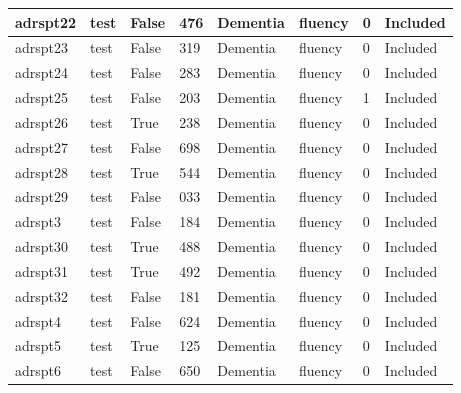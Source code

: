 \begin{center}
\begin{longtable}{|l|l|l|l|l|l|l|l|}
adrspt22       & test                  & False             & 476     & Dementia       & fluency         & 0            & Included      \\ \hline
adrspt23       & test                  & False             & 319     & Dementia       & fluency         & 0            & Included      \\ \hline
adrspt24       & test                  & False             & 283     & Dementia       & fluency         & 0            & Included      \\ \hline
adrspt25       & test                  & False             & 203     & Dementia       & fluency         & 1            & Included      \\ \hline
adrspt26       & test                  & True              & 238     & Dementia       & fluency         & 0            & Included      \\ \hline
adrspt27       & test                  & False             & 698     & Dementia       & fluency         & 0            & Included      \\ \hline
adrspt28       & test                  & True              & 544     & Dementia       & fluency         & 0            & Included      \\ \hline
adrspt29       & test                  & False             & 033     & Dementia       & fluency         & 0            & Included      \\ \hline
adrspt3        & test                  & False             & 184     & Dementia       & fluency         & 0            & Included      \\ \hline
adrspt30       & test                  & True              & 488     & Dementia       & fluency         & 0            & Included      \\ \hline
adrspt31       & test                  & True              & 492     & Dementia       & fluency         & 0            & Included      \\ \hline
adrspt32       & test                  & False             & 181     & Dementia       & fluency         & 0            & Included      \\ \hline
adrspt4        & test                  & False             & 624     & Dementia       & fluency         & 0            & Included      \\ \hline
adrspt5        & test                  & True              & 125     & Dementia       & fluency         & 0            & Included      \\ \hline
adrspt6        & test                  & False             & 650     & Dementia       & fluency         & 0            & Included      \\ \hline

\end{longtable}
\end{center}
